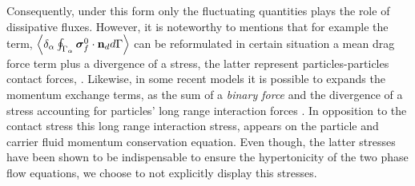 Consequently, under this form only the fluctuating quantities plays the role of dissipative fluxes. 
However, it is noteworthy to mentions that for example the term, $ \left<\delta_\alpha \oint_{\Gamma_\alpha} {\bm{\sigma}_f^0 \cdot \textbf{n}_d} d\Gamma\right>$ can be reformulated in certain situation a mean drag force term plus a divergence of a stress, the latter represent particles-particles contact forces, \citet{jackson1997locally,zhang1997momentum,nott2011suspension,zhang2021ensemble}. 
Likewise, in some recent models it is possible to expands the momentum exchange terms, as the sum of a \textit{binary force} and the divergence of a stress accounting for particles' long range interaction forces \citep{zhang2021ensemble,nott2011suspension}. 
In opposition to the contact stress this long range interaction stress, appears on the particle and carrier fluid momentum conservation equation. 
Even though, the latter stresses have been shown to be indispensable to ensure the hypertonicity of the two phase flow equations\citep{fox2020hyperbolic}, we choose to not explicitly display this stresses. 



